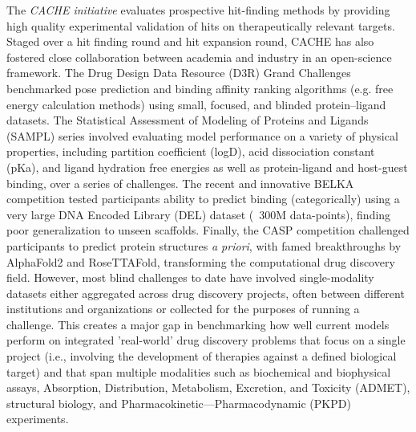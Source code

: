 \documentclass[journal=jcim,manuscript=article]{achemso}
\begin{document}
The \textit{CACHE initiative}\cite{ackloo_al-awar_amaro_arrowsmith_azevedo_al._2022} evaluates prospective hit-finding methods by providing high quality experimental validation of hits on therapeutically relevant targets. Staged over a hit finding round and hit expansion round, CACHE has also fostered close collaboration between academia and industry in an open-science framework. The Drug Design Data Resource (D3R) Grand Challenges\cite{parks_gaieb_chiu_yang_shao_walters_jansen_mcgaughey_lewis_bembenek_et} benchmarked pose prediction and binding affinity ranking algorithms (e.g. free energy calculation methods) using small, focused, and blinded protein–ligand datasets. The Statistical Assessment of Modeling of Proteins and Ligands (SAMPL) series\cite{sampl6_2018, sampl7_2022, sampl8_2022, sampl9_2024} involved evaluating model performance on a variety of physical properties, including partition coefficient (logD), acid dissociation constant (pKa), and ligand hydration free energies as well as protein-ligand and host-guest binding, over a series of challenges. The recent and innovative BELKA competition\cite{quigley2024belka} tested participants ability to predict binding (categorically) using a very large DNA Encoded Library (DEL) dataset (~300M data-points), finding poor generalization to unseen scaffolds. Finally, the CASP competition\cite{casp13_2019, casp14_2021, casp15_2023} challenged participants to predict protein structures \textit{a priori}, with famed breakthroughs by AlphaFold2 and RoseTTAFold, transforming the computational drug discovery field.\cite{jumper_evans_pritzel_green_figurnov_ronneberger_tunyasuvunakool_bates_žídek_2021, baek_2021} However, most blind challenges to date have involved single-modality datasets either aggregated across drug discovery projects, often between different institutions and organizations or collected for the purposes of running a challenge. This creates a major gap in benchmarking how well current models perform on integrated 'real-world' drug discovery problems that focus on a single project (i.e., involving the development of therapies against a defined biological target) and that span multiple modalities such as biochemical and biophysical assays, Absorption, Distribution, Metabolism, Excretion, and Toxicity (ADMET), structural biology, and Pharmacokinetic—Pharmacodynamic (PKPD) experiments\cite{wognum_call_2024, volkamer_machine_2023}.
\end{document}
